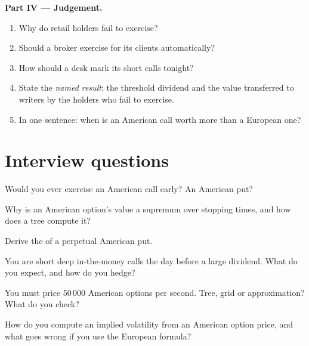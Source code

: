 \begin{problem}
\medskip\noindent\textbf{Part IV --- Judgement.}
\begin{enumerate}[resume]
\item Why do retail holders fail to exercise?
\item Should a broker exercise for its clients automatically?
\item How should a desk mark its short calls tonight?
\item State the \emph{named result}: the threshold dividend and the value transferred to
writers by the holders who fail to exercise.
\item In one sentence: when is an American call worth more than a European one?
\end{enumerate}
\end{problem}

\section{Interview questions}

\begin{interviewq}\label{iq:dv:american-options-and-early-exercise:1}
Would you ever exercise an American call early? An American put?
\end{interviewq}

\begin{interviewq}\label{iq:dv:american-options-and-early-exercise:2}
Why is an American option's value a supremum over stopping times, and how does a tree
compute it?
\end{interviewq}

\begin{interviewq}\label{iq:dv:american-options-and-early-exercise:3}
Derive the  of a perpetual American put.
\end{interviewq}

\begin{interviewq}\label{iq:dv:american-options-and-early-exercise:4}
You are short deep in-the-money calls the day before a large dividend. What do you expect,
and how do you hedge?
\end{interviewq}

\begin{interviewq}\label{iq:dv:american-options-and-early-exercise:5}
You must price 50\,000 American options per second. Tree, grid or approximation? What do you
check?
\end{interviewq}

\begin{interviewq}\label{iq:dv:american-options-and-early-exercise:6}
How do you compute an implied volatility from an American option price, and what goes wrong
if you use the European formula?
\end{interviewq}
